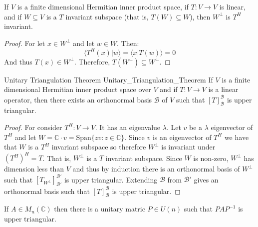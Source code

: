 \documentclass{article}                                                        %
\begin{document}
        \begin{theorem}
            If $V$ is a finite dimensional Hermitian inner product space, if
            $T:V\rightarrow{V}$ is linear, and if $W\subseteq{V}$ is a $T$
            invariant subspace (that is, $T(W)\subseteq{W}$), then
            $W^{\perp}$ is $T^{H}$ invariant.
        \end{theorem}
        \begin{proof}
            For let $x\in{W}^{\perp}$ and let $w\in{W}$. Then:
            \begin{equation}
                \langle{T}^{H}(x)|w\rangle
                =\langle{x}|T(w)\rangle=0
            \end{equation}
            And thus $T(x)\in{W}^{\perp}$. Therefore,
            $T(W^{\perp})\subseteq{W}^{\perp}$.
        \end{proof}
        \begin{ltheorem}{Unitary Triangulation Theorem}
                        {Unitary_Triangulation_Theorem}
            If $V$ is a finite dimensional Hermitian inner product space over
            $V$ and if $T:V\rightarrow{V}$ is a linear operator, then there
            exists an orthonormal basis $\mathscr{B}$ of $V$ such that
            $[T]_{\mathscr{B}}^{\mathscr{B}}$ is upper triangular.
        \end{ltheorem}
        \begin{proof}
            For consider $T^{H}:V\rightarrow{V}$. It has an eigenvalue
            $\lambda$. Let $v$ be a $\lambda$ eigenvector of $T^{H}$ and let
            $W=\mathbb{C}\cdot{v}=\textrm{Span}\{zv:z\in\mathbb{C}\}$. Since
            $v$ is an eigenvector of $T^{H}$ we have that $W$ is a $T^{H}$
            invariant subspace so therefore $W^{\perp}$ is invariant under
            $(T^{H})^{H}=T$. That is, $W^{\perp}$ is a $T$ invariant subspace.
            Since $W$ is non-zero, $W^{\perp}$ has dimension less than $V$ and
            thus by induction there is an orthonormal basis of $W^{\perp}$ such
            that $[T_{W^{\perp}}]_{\mathscr{B}'}^{\mathscr{B}'}$ is upper
            triangular. Extending $\mathscr{B}$ from $\mathscr{B}'$ gives an
            orthonormal basis such that $[T]_{\mathscr{B}}^{\mathscr{B}}$ is
            upper triangular.
        \end{proof}
        \begin{theorem}
            If $A\in{M}_{n}(\mathbb{C})$ then there is a unitary matric
            $P\in{U}(n)$ such that $PAP^{\minus{1}}$ is upper triangular.
        \end{theorem}
\end{document}
